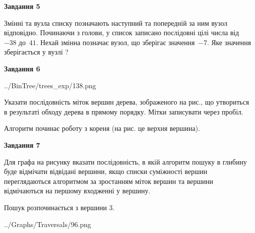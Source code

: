 \documentclass[12pt, ukrainian]{article}
\begin{document}
{\begin {large}
{\begin {center}\textbf{Завдання 5}\end {center}}\par
Змінні  та  вузла списку позначають наступний та попередній за ним вузол відповідно. Починаючи з голови, у список записано послідовні цілі числа від~$-38$ до~$41$. Нехай змінна  позначає вузол, що зберігає значення~$-7$.
Яке значення зберігається у вузлі  ?\par
\newpage

{\begin {center}\textbf{Завдання 6}\end {center}}\par

\begin{center}
	{../BinTree/trees_exp/138.png}
\end{center}
Указати послідовність міток вершин дерева, зображеного на рис., що утвориться в результаті обходу дерева в прямому порядку. Мітки записувати через пробіл.\par Алгоритм починає роботу з кореня (на рис. це верхня вершина).\par
\newpage

{\begin {center}\textbf{Завдання 7}\end {center}}\par
Для графа на рисунку вказати послідовність, в якій алгоритм пошуку в глибину буде відмічати відвідані вершини, якщо списки суміжності вершин переглядаються алгоритмом за зростанням міток вершин та вершини відмічаються на першому вход\-женні у вершину.\par
Пошук розпочинається з вершини 3.\par

\begin{center}
	{../Graphs/Traversals/96.png}
\end{center}\par
\newpage


\end{large}}
\end{document}
